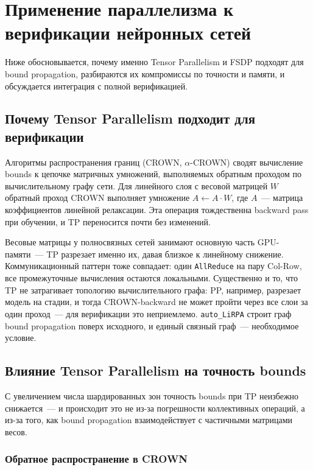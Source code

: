 \section{Применение параллелизма к верификации нейронных сетей}
\label{sec:parallel-verifiers}

Ниже обосновывается, почему именно Tensor Parallelism и FSDP
подходят для bound propagation, разбираются их компромиссы по точности
и памяти, и обсуждается интеграция с полной верификацией.

\subsection{Почему Tensor Parallelism подходит для верификации}

Алгоритмы распространения границ (CROWN, $\alpha$-CROWN) сводят
вычисление bounds к цепочке матричных умножений, выполняемых обратным
проходом по вычислительному графу сети. Для линейного слоя с весовой
матрицей $W$ обратный проход CROWN выполняет умножение
$A \leftarrow A \cdot W$, где $A$~--- матрица коэффициентов линейной
релаксации. Эта операция тождественна backward pass при обучении, и TP переносится
почти без изменений.

Весовые матрицы у полносвязных сетей занимают основную часть
GPU-памяти~--- TP разрезает именно их, давая близкое к линейному
снижение. Коммуникационный паттерн тоже совпадает: один
\texttt{AllReduce} на пару Col-Row, все промежуточные вычисления
остаются локальными. Существенно и то, что TP не затрагивает топологию
вычислительного графа: PP, например, разрезает модель на стадии, и тогда
CROWN-backward не может пройти через все слои за один проход~--- для
верификации это неприемлемо. \texttt{auto\_LiRPA} строит граф bound
propagation поверх исходного, и единый связный граф~--- необходимое
условие.

\subsection{Влияние Tensor Parallelism на точность bounds}
\label{sec:tp-precision-loss}

С увеличением числа шардированных зон точность bounds при TP неизбежно
снижается~--- и происходит это не из-за погрешности коллективных
операций, а из-за того, как bound propagation взаимодействует
с частичными матрицами весов.

\subsubsection{Обратное распространение в CROWN}

